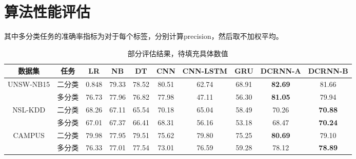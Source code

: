 \section{算法性能评估}

其中多分类任务的准确率指标为对于每个标签，分别计算precision，然后取不加权平均。

\begin{table*}[t]
    \small
    \caption{部分评估结果，待填充具体数值}
    \label{table2}
    \centering
    \begin{tabular}{c|c|ccc|ccc|cc}
    \toprule
    
     数据集 &  任务  &  
     LR &  NB & DT & CNN & CNN-LSTM & GRU & DCRNN-A & DCRNN-B \\
    \midrule
    
    
    UNSW-NB15 & 二分类 & 0.848 & 79.33 & 78.52 &  80.51 & 62.74 & 68.91 & \textbf{82.69} & 81.66 \\ 
    
    & 多分类 &76.73 & 77.96 & 76.82 & 77.98 & 47.11 & 56.30 & \textbf{81.05} & 79.94 \\
    
    \midrule
    NSL-KDD & 二分类 & 68.26 & 67.11 & 65.54 & 70.18 & 65.04 & 58.49 & 70.26 & \textbf{70.88} \\
    & 多分类 & 67.01 & 67.37 & 66.41 & 68.31 & 56.16 & 53.18 & 68.47 & \textbf{70.24} \\
    \midrule
    CAMPUS & 二分类 & 79.98 & 77.95 & 79.51 & 75.62 & 79.80 & 75.25 & \textbf{80.69} & 79.10\\
    & 多分类 & 76.33 & 77.01 & 77.54 & 73.01 & 76.59 & 59.28 & 78.12 & \textbf{78.89}\\
    
     \bottomrule
    
    \end{tabular}
    \end{table*}

